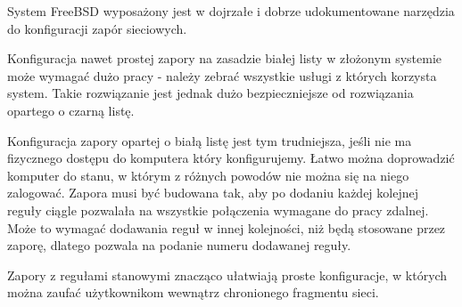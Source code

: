 System FreeBSD  wyposażony jest w dojrzałe i dobrze udokumentowane narzędzia do konfiguracji zapór sieciowych.

Konfiguracja nawet prostej zapory na zasadzie białej listy w złożonym systemie może wymagać dużo pracy - należy zebrać wszystkie usługi z których korzysta system.
Takie rozwiązanie jest jednak dużo bezpieczniejsze od rozwiązania opartego o czarną listę.

Konfiguracja zapory opartej o białą listę jest tym trudniejsza, jeśli nie ma fizycznego dostępu do komputera który konfigurujemy.
Łatwo można doprowadzić komputer do stanu, w którym z różnych powodów nie można się na niego zalogować.
Zapora musi być budowana tak, aby po dodaniu każdej kolejnej reguły ciągle pozwalała na wszystkie połączenia wymagane do pracy zdalnej.
Może to wymagać dodawania reguł w innej kolejności, niż będą stosowane przez zaporę, dlatego \ipfw{} pozwala na podanie numeru dodawanej reguły.

Zapory z regułami stanowymi znacząco ułatwiają proste konfiguracje, w których można zaufać użytkownikom wewnątrz chronionego fragmentu sieci.
